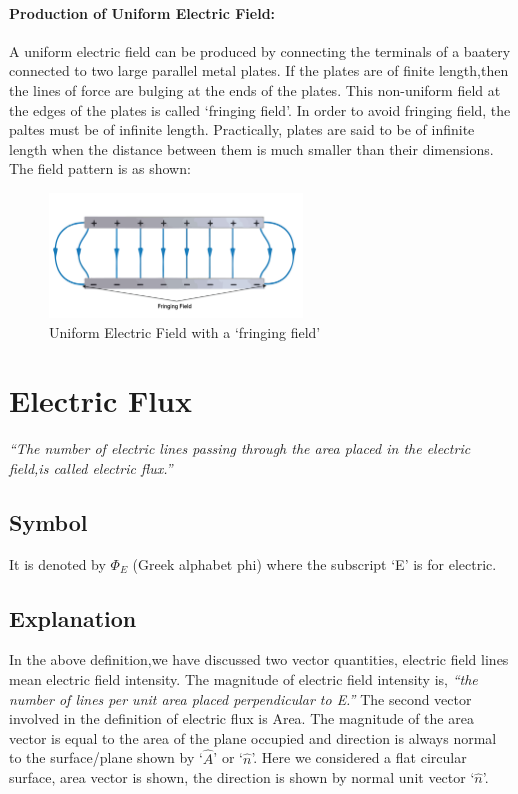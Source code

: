 \paragraph{Production of Uniform Electric Field:}
A uniform electric field can be produced by connecting the
terminals of a baatery connected to two large parallel metal plates.
If the plates are of finite length,then the lines of force are bulging
at the ends of the plates. This non-uniform field at the edges
of the plates is called ‘fringing field’. In order to avoid fringing field,
the paltes must be of infinite length. Practically, plates are said to
be of infinite length when the distance between them is much smaller than
their dimensions. The field pattern is as shown:

\begin{figure}[H]
  \centering
  \includegraphics[width=0.6\textwidth]{Images/11.8.png}
  \caption{Uniform Electric Field with a `fringing field'}
  \label{fig:11.8}
\end{figure}

\section{Electric Flux}
\textit{“The number of electric lines passing through the area placed in the electric field,is called electric flux.”}
\subsection*{Symbol}
It is denoted by $\Phi_{E}$ (Greek alphabet phi) where the subscript ‘E’ is for electric.
\subsection*{Explanation}
In the above definition,we have discussed two vector quantities,
electric field lines mean electric field intensity. The magnitude of
electric field intensity is, \textit{“the number of lines per unit area
placed perpendicular to E.”} The second vector involved in the
definition of electric flux is Area. The magnitude of the area vector
is equal to the area of the plane occupied and direction is always normal
to the surface/plane shown by `$\hat{A}$' or `$\hat{n}$'.
Here we considered a flat circular surface, area vector is shown,
the direction is shown by normal unit vector `$\hat{n}$'.
